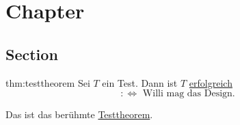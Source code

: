 
\chapter{Chapter}
\section{Section}

\begin{theo}[Testtheorem]{thm:testtheorem}
	Sei $T$ ein Test. Dann ist $T$ \underline{erfolgreich} 
	\[
	:\iff \text{ Willi mag das Design}
	.\] 
\end{theo}

Das ist das berühmte \href{thm:testtheorem}{Testtheorem}.
